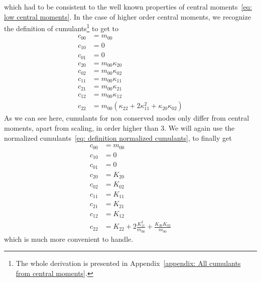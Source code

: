 which had to be consistent to the well known properties of central moments~\eqref{eq: low central moments}.
In the case of higher order central moments, we recognize the definition of cumulants\footnote{The whole derivation is presented in Appendix~\ref{appendix: All cumulants from central moments}.} to get to
\begin{equation}
  \label{eq: all central moments from cumulants}
  \begin{aligned}
    c_{00} & = m_{00} \\
    c_{10} & = 0 \\
    c_{01} & = 0 \\
    c_{20} & = m_{00}\kappa_{20} \\
    c_{02} & = m_{00}\kappa_{02} \\
    c_{11} & = m_{00}\kappa_{11} \\
    c_{21} & = m_{00}\kappa_{21} \\
    c_{12} & = m_{00}\kappa_{12} \\
    c_{22} & = m_{00}(\kappa_{22} + 2\kappa_{11}^2 + \kappa_{20}\kappa_{02})
  \end{aligned}
\end{equation}
As we can see here, cumulants for non conserved modes only differ from central moments, apart from scaling, in order higher than $3$.
We will again use the normalized cumulants~\eqref{eq: definition normalized cumulants}, to finally get
\begin{equation}
  \label{eq: all central moments from normalized cumulants}
  \begin{aligned}
    c_{00} & = m_{00}\\
    c_{10} & = 0 \\
    c_{01} & = 0 \\
    c_{20} & = K_{20} \\
    c_{02} & = K_{02} \\
    c_{11} & = K_{11} \\
    c_{21} & = K_{21} \\
    c_{12} & = K_{12} \\
    c_{22} & = K_{22} + 2 \frac{K_{11}^2}{m_{00}} + \frac{K_{20}K_{02}}{m_{00}}
  \end{aligned}
\end{equation}
which is much more convenient to handle.
